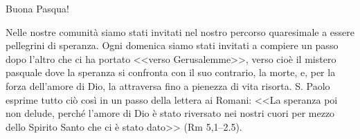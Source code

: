 Buona Pasqua!


\clearpage

Nelle nostre comunità siamo stati invitati nel nostro percorso quaresimale a essere pellegrini di speranza. Ogni domenica siamo stati invitati a compiere un passo dopo l'altro che ci ha portato <<verso Gerusalemme>>, verso cioè il mistero pasquale dove la speranza si confronta con il suo contrario, la morte, e, per la forza dell'amore di Dio, la attraversa fino a pienezza di vita risorta. S. Paolo esprime tutto ciò così in un passo della lettera ai Romani: <<La speranza poi non delude, perché l'amore di Dio è stato riversato nei nostri cuori per mezzo dello Spirito Santo che ci è stato dato>> (Rm 5,1--2.5).
